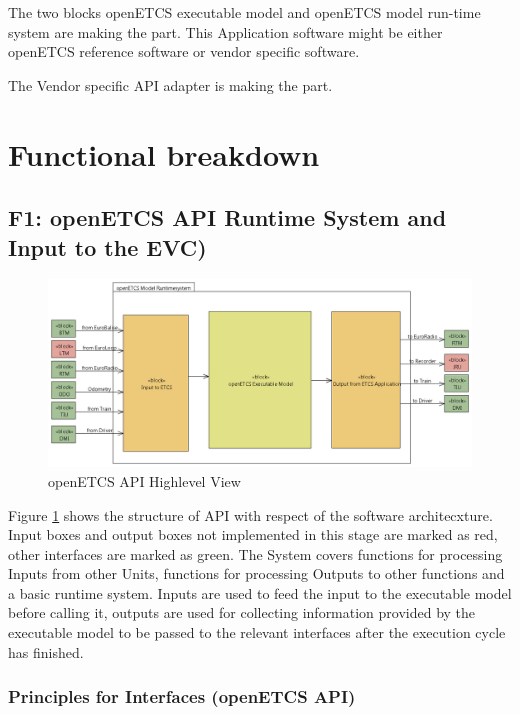 \documentclass{template/openetcs_report}
\begin{document}
The two blocks openETCS executable model and openETCS model run-time
system are making the  part. This Application software might be either openETCS reference software or
vendor specific software.

The Vendor specific \gls{API} adapter is making the  part.


\section{Functional breakdown}

\subsection{F1: openETCS \gls{API} Runtime System and Input to the EVC)}

\begin{figure}[hbtp]
\centering
\includegraphics[width=\linewidth]{openETCSAPI.png}
\caption{openETCS API Highlevel View}
\label{fig:apiHighLevel}
\end{figure}

Figure \ref{fig:apiHighLevel} shows the structure of API with respect of the software architecxture. Input boxes and output boxes not implemented in this stage are marked as red, other interfaces are marked as green. The System covers functions for processing Inputs from other Units, functions for processing Outputs to other functions and a basic runtime system. Inputs are used to feed the input to the executable model before calling it, outputs are used for collecting information provided by the executable model to be passed to the relevant interfaces after the execution cycle has finished.

\subsubsection{Principles for Interfaces (openETCS \gls{API})}
\end{document}
